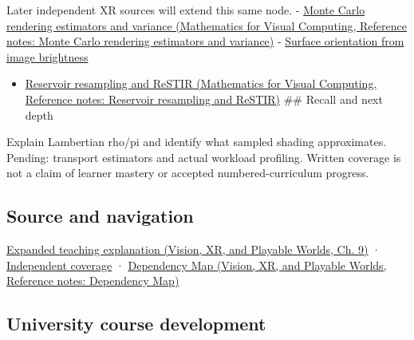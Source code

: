 Later independent XR sources will extend this same node. - \href{../02-Mathematics-for-Visual-Computing/main.pdf\#nameddest=appendix-031e02bf28af}{Monte Carlo rendering estimators and variance (Mathematics for Visual Computing, Reference notes: Monte Carlo rendering estimators and variance)} - \hyperref[appendix-89b2d5b7c9e1]{Surface orientation from image brightness}

\begin{itemize}
\tightlist
\item
  \href{../02-Mathematics-for-Visual-Computing/main.pdf\#nameddest=appendix-68be451b78b1}{Reservoir resampling and ReSTIR (Mathematics for Visual Computing, Reference notes: Reservoir resampling and ReSTIR)} \#\# Recall and next depth
\end{itemize}

Explain Lambertian rho/pi and identify what sampled shading approximates. Pending: transport estimators and actual workload profiling. Written coverage is not a claim of learner mastery or accepted numbered-curriculum progress.

\subsection{Source and navigation}\label{appendix-96da0b153b77-source-and-navigation}

\hypertarget{appendix-96da0b153b77-source-and-navigation}{}

\href{../07-Vision-XR-and-Playable-Worlds/main.pdf\#nameddest=04-visual-computing-ii-ch042-materials-turn-incoming-light-into-outgoing-light}{Expanded teaching explanation (Vision, XR, and Playable Worlds, Ch. 9)} · \hyperref[appendix-fd090d982a15-xr01---independent-seeing-and-representation-source]{Independent coverage} · \href{../07-Vision-XR-and-Playable-Worlds/main.pdf\#nameddest=appendix-4ad47bdd269a}{Dependency Map (Vision, XR, and Playable Worlds, Reference notes: Dependency Map)}

\subsection{University course development}\label{appendix-96da0b153b77-university-course-development}

\hypertarget{appendix-96da0b153b77-university-course-development}{}

